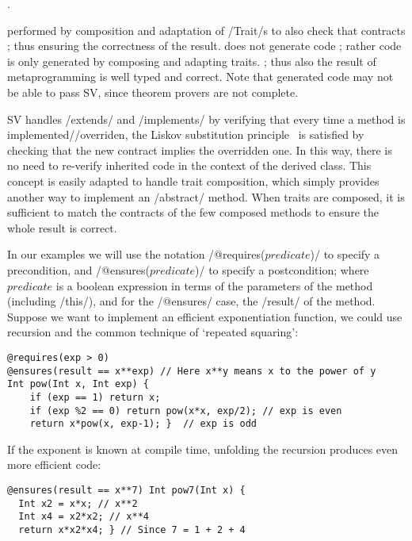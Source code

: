 .

 performed by composition and adaptation of /Trait/s to also check that contracts ; thus ensuring the correctness of the result.
%
%
 does not generate code ; rather code is only generated by composing and adapting traits.
; thus also the result of metaprogramming is well typed and correct.
Note that generated code may not be able to pass SV, since theorem provers are not complete.


SV handles /extends/ and /implements/ by verifying that every 
time a method is implemented//overriden, 
the Liskov substitution principle~\cite{Liskov:1994:BNS:197320.197383} is satisfied
by checking that the new contract implies the
overridden one. 
 In this way, there is no need to re-verify
inherited code in the context of the derived class.
This concept is easily adapted
to handle trait composition, which simply provides another way to implement an /abstract/ method.
When traits are composed,
it is sufficient
to match the contracts of the few composed methods
to ensure the whole result is correct.

In our examples we will use the notation /@requires($predicate$)/ 
to specify a precondition, and /@ensures($predicate$)/ 
to specify a postcondition; where $predicate$ is a boolean expression
in terms of the parameters of the method (including /this/), and for the /@ensures/ case, the /result/ of the method.
Suppose we want to implement an efficient exponentiation function, we could use recursion and the common technique of `repeated squaring':
\vspace{-1ex}
\begin{lstlisting}
@requires(exp > 0)
@ensures(result == x**exp) // Here x**y means x to the power of y
Int pow(Int x, Int exp) {
	if (exp == 1) return x;
	if (exp %2 == 0) return pow(x*x, exp/2); // exp is even
	return x*pow(x, exp-1); }  // exp is odd
\end{lstlisting}
If the exponent is known at compile time,
unfolding the recursion produces even more efficient code:
\vspace{-1ex}
\begin{lstlisting}[firstnumber=7]
@ensures(result == x**7) Int pow7(Int x) { 
  Int x2 = x*x; // x**2
  Int x4 = x2*x2; // x**4
  return x*x2*x4; } // Since 7 = 1 + 2 + 4
\end{lstlisting}
\vspace{-1ex}



